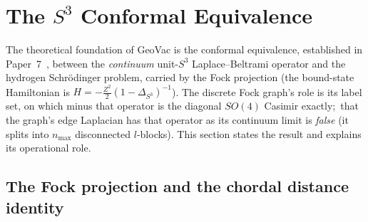 \documentclass[aps,pra,twocolumn,superscriptaddress,longbibliography]{revtex4-2}
\newcommand{\gvc}[2]{#2}
\begin{document}
\section{The $S^3$ Conformal Equivalence}
\label{sec:s3}

The theoretical foundation of GeoVac is the conformal equivalence,
established in Paper~7~\cite{loutey_paper7}, between the \emph{continuum}
unit-$S^3$ Laplace--Beltrami operator and the hydrogen Schr\"odinger
problem, carried by the Fock projection (the bound-state Hamiltonian is
$H = -\tfrac{Z^2}{2}(1-\Delta_{S^3})^{-1}$).  The
discrete Fock graph's role is its label set, on which minus that
operator is the diagonal $SO(4)$ Casimir exactly;\ \gvc{graph-s3-wall}{that the graph's edge Laplacian
has that operator as its continuum limit is \emph{false} (it splits
into $n_{\max}$ disconnected $l$-blocks)}.  This section
states the result and explains its operational role.

\subsection*{The Fock projection and the chordal distance identity}
\end{document}
